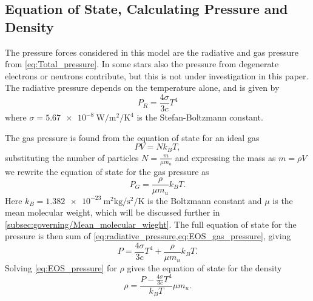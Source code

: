 \documentclass[11pt,a4paper,twocolumn,titlepage]{article}
\begin{document}
\subsection{Equation of State, Calculating Pressure and Density}
\label{subsec:governing/EOS_p_rho}
The pressure forces considered in this model are the radiative and gas pressure from \cref{eq:Total_pressure}. In some stars also the pressure from degenerate electrons or neutrons contribute, but this is not under investigation in this paper. The radiative pressure depends on the temperature alone, and is given by
\begin{equation}
P_R = \frac{4\sigma}{3c}T^4 \label{eq:radiative_pressure}
\end{equation}
where ${\sigma = \SI{5.67e-8}{\watt\per\meter\squared\per\kelvin\tothe{4}}}$ is the Stefan-Boltzmann constant.

The gas pressure is found from the equation of state for an ideal gas
\begin{equation}
PV = Nk_BT, \label{eq:EOS_ideal_gass}
\end{equation}
substituting the number of particles ${N = \frac{m}{\mu m_u}}$ and expressing the mass as $m = \rho V$ we rewrite the equation of state for the gas pressure as
\begin{equation}
P_G = \frac{\rho}{\mu m_u}k_B T. \label{eq:EOS_gas_pressure}
\end{equation}
Here ${k_B = \SI{1.382e-23}{\meter\squared\kilogram\per\second\squared\per\kelvin}}$ is the Boltzmann constant and $\mu$ is the mean molecular weight, which will be discussed further in \cref{subsec:governing/Mean_molecular_wieght}. The full equation of state for the pressure is then sum of \cref{eq:radiative_pressure,eq:EOS_gas_pressure}, giving
\begin{equation}
P = \frac{4\sigma}{3c}T^4 +  \frac{\rho}{\mu m_u}k_B T. \label{eq:EOS_pressure}
\end{equation}
Solving \cref{eq:EOS_pressure} for $\rho$ gives the equation of state for the density
\begin{equation}
\rho = \frac{P-\frac{4\sigma}{3c}T^4}{k_BT}\mu m_u. \label{eq:EOS_rho}
\end{equation}

\end{document}
